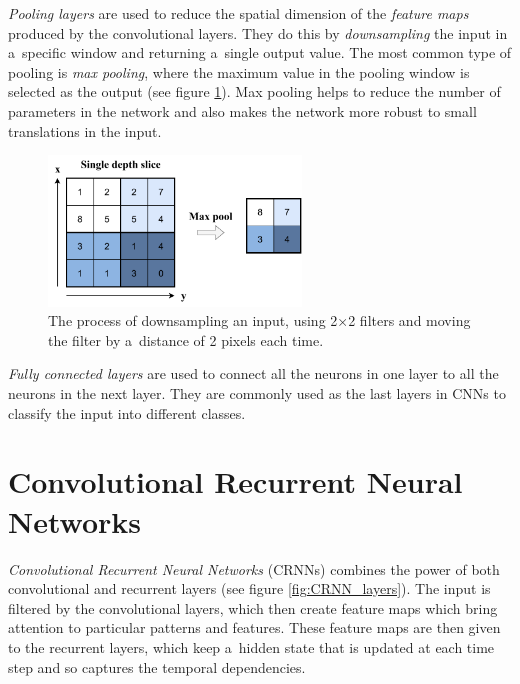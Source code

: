 \textit{Pooling layers} are used to reduce the spatial dimension of the \textit{feature maps} produced by the convolutional layers. They do this by \textit{downsampling} the input in a~specific window and returning a~single output value. The most common type of pooling is \textit{max pooling}, where the maximum value in the pooling window is selected as the output (see figure \ref{fig:maxpool}). Max pooling helps to reduce the number of parameters in the network and also makes the network more robust to small translations in the input.

    \begin{figure}[ht!]
        \centering
        \includegraphics[width = 0.6\textwidth]{obrazky-figures/maxpool.pdf}
        \caption{The process of downsampling an input, using 2×2 filters and moving the filter by a~distance of 2 pixels each time.}
        \label{fig:maxpool}
    \end{figure}

\textit{Fully connected layers} are used to connect all the neurons in one layer to all the neurons in the next layer. They are commonly used as the last layers in CNNs to classify the input into different classes. 


\section{Convolutional Recurrent Neural Networks}

\textit{Convolutional Recurrent Neural Networks} (CRNNs) \cite{shi2015convolutional} combines the power of both convolutional and recurrent layers (see figure \ref{fig:CRNN_layers}). The input is filtered by the convolutional layers, which then create feature maps which bring attention to particular patterns and features. These feature maps are then given to the recurrent layers, which keep a~hidden state that is updated at each time step and so captures the temporal dependencies.

